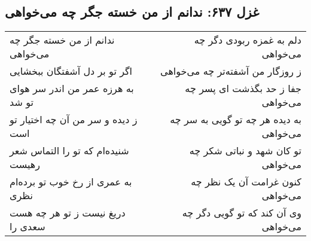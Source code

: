 \begin{center}
\section*{غزل ۶۳۷: ندانم از من خسته جگر چه می‌خواهی}
\label{sec:637}
\begin{longtable}{l p{0.5cm} r}
ندانم از من خسته جگر چه می‌خواهی
&&
دلم به غمزه ربودی دگر چه می‌خواهی
\\
اگر تو بر دل آشفتگان ببخشایی
&&
ز روزگار من آشفته‌تر چه می‌خواهی
\\
به هرزه عمر من اندر سر هوای تو شد
&&
جفا ز حد بگذشت ای پسر چه می‌خواهی
\\
ز دیده و سر من آن چه اختیار تو است
&&
به دیده هر چه تو گویی به سر چه می‌خواهی
\\
شنیده‌ام که تو را التماس شعر رهیست
&&
تو کان شهد و نباتی شکر چه می‌خواهی
\\
به عمری از رخ خوب تو برده‌ام نظری
&&
کنون غرامت آن یک نظر چه می‌خواهی
\\
دریغ نیست ز تو هر چه هست سعدی را
&&
وی آن کند که تو گویی دگر چه می‌خواهی
\\
\end{longtable}
\end{center}
